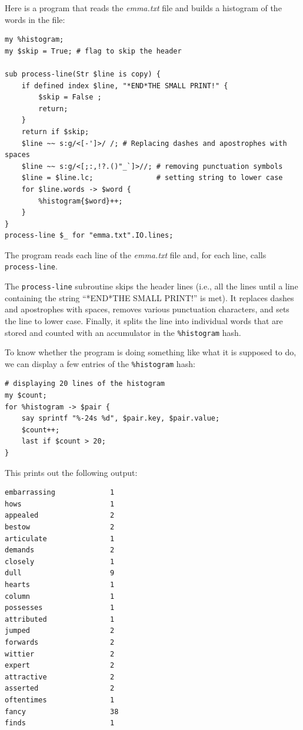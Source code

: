 Here is a program that reads the \emph{emma.txt} file and 
builds a histogram of the words in the file:

\begin{verbatim}
my %histogram;
my $skip = True; # flag to skip the header

sub process-line(Str $line is copy) {
    if defined index $line, "*END*THE SMALL PRINT!" {
        $skip = False ;
        return;
    }
    return if $skip;
    $line ~~ s:g/<[-']>/ /; # Replacing dashes and apostrophes with spaces
    $line ~~ s:g/<[;:,!?.()"_`]>//; # removing punctuation symbols
    $line = $line.lc;               # setting string to lower case
    for $line.words -> $word {
        %histogram{$word}++;
    }
}
process-line $_ for "emma.txt".IO.lines; 
\end{verbatim}
%

The program reads each line of the \emph{emma.txt} file and, for 
each line, calls \verb"process-line". 

The \verb"process-line" subroutine skips the header lines 
(i.e., all the lines until a line containing the string
``*END*THE SMALL PRINT!'' 
is met). It replaces dashes and apostrophes with spaces, removes 
various punctuation characters, and sets the line to lower case. 
Finally, it splits the line into individual words that are 
stored and counted with an accumulator in the \verb'%histogram' 
hash.

To know whether the program is doing something like what 
it is supposed to do, we can display a few entries of the 
\verb'%histogram' hash:

\begin{verbatim}
# displaying 20 lines of the histogram
my $count;
for %histogram -> $pair {
    say sprintf "%-24s %d", $pair.key, $pair.value;
    $count++;
    last if $count > 20;
}
\end{verbatim}

This prints out the following output:

\begin{verbatim}
embarrassing             1
hows                     1
appealed                 2
bestow                   2
articulate               1
demands                  2
closely                  1
dull                     9
hearts                   1
column                   1
possesses                1
attributed               1
jumped                   2
forwards                 2
wittier                  2
expert                   2
attractive               2
asserted                 2
oftentimes               1
fancy                    38
finds                    1
\end{verbatim}


